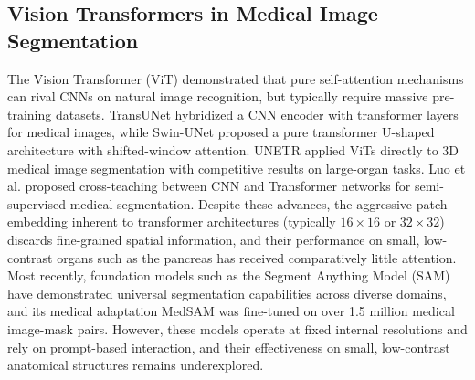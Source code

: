 \documentclass[journal, twocolumn]{IEEEtran}
\begin{document}
\subsection{Vision Transformers in Medical Image Segmentation}
The Vision Transformer (ViT) \cite{dosovitskiy2020image} demonstrated that pure self-attention mechanisms can rival CNNs on natural image recognition, but typically require massive pre-training datasets. TransUNet \cite{transunet} hybridized a CNN encoder with transformer layers for medical images, while Swin-UNet \cite{swinunet} proposed a pure transformer U-shaped architecture with shifted-window attention. UNETR \cite{unetr_ref} applied ViTs directly to 3D medical image segmentation with competitive results on large-organ tasks. Luo et al. \cite{swin_teaching} proposed cross-teaching between CNN and Transformer networks for semi-supervised medical segmentation. Despite these advances, the aggressive patch embedding inherent to transformer architectures (typically $16 \times 16$ or $32 \times 32$) discards fine-grained spatial information, and their performance on small, low-contrast organs such as the pancreas has received comparatively little attention. Most recently, foundation models such as the Segment Anything Model (SAM) \cite{sam} have demonstrated universal segmentation capabilities across diverse domains, and its medical adaptation MedSAM \cite{medsam} was fine-tuned on over 1.5 million medical image-mask pairs. However, these models operate at fixed internal resolutions and rely on prompt-based interaction, and their effectiveness on small, low-contrast anatomical structures remains underexplored.
\end{document}
